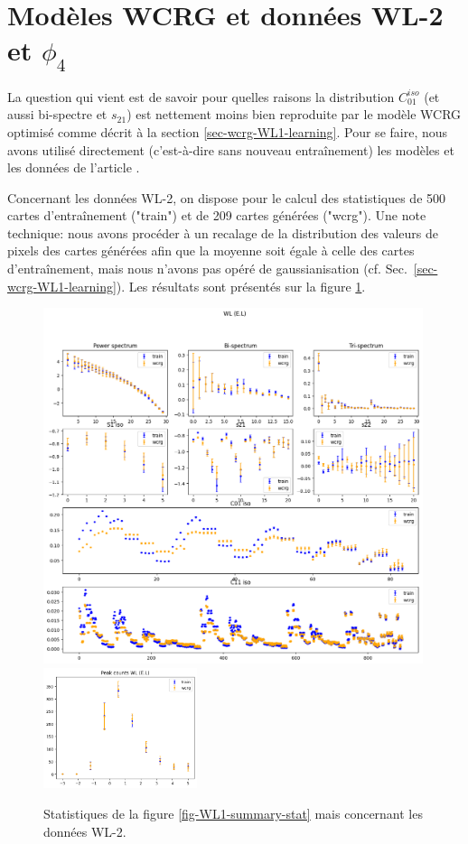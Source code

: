 \documentclass[12pt,twoside]{article}
\begin{document}
\section{Modèles WCRG et données WL-2 et $\phi_4$}
\label{sec:WL2_Phi4}
%
La question qui vient est de savoir pour quelles raisons la distribution $C_{01}^{iso}$ (et aussi bi-spectre et $s_{21}$) est nettement moins bien reproduite par le modèle WCRG optimisé comme décrit à la section \ref{sec-wcrg-WL1-learning}. Pour se faire, nous avons utilisé directement (c'est-à-dire sans nouveau entraînement) les modèles et les données de l'article \citep{2023arXiv230600181G}.

Concernant les données WL-2, on dispose pour le calcul des statistiques de 500 cartes d'entraînement ("train") et de 209 cartes générées ("wcrg"). Une note technique: nous avons procéder à un recalage de la distribution des valeurs de pixels des cartes générées afin que la moyenne soit égale à celle des cartes d'entraînement, mais nous n'avons pas opéré de gaussianisation (cf. Sec.~\ref{sec-wcrg-WL1-learning}). Les résultats sont présentés sur la figure \ref{fig-WL2-summary-stat}.
\begin{figure}
\centering
\includegraphics[width=0.99\textwidth]{fig-WL2-summary-stat.png}\\
\includegraphics[width=0.4\textwidth]{fig-WL2-peak-count.png}
\caption{Statistiques de la figure \ref{fig-WL1-summary-stat} mais concernant les données WL-2.}
\label{fig-WL2-summary-stat}
\end{figure}
\end{document}
